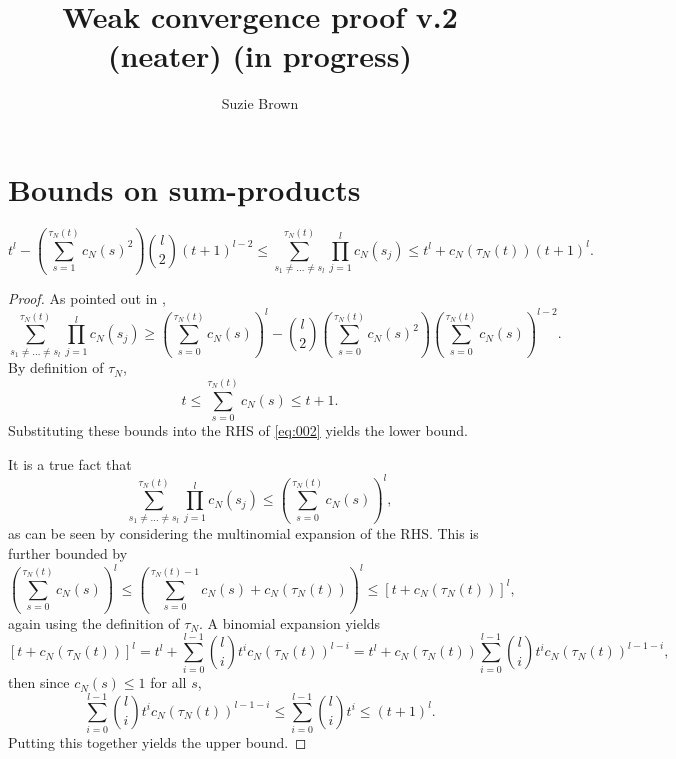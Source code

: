 \documentclass{article}
\title{Weak convergence proof v.2 (neater) (in progress)}
\author{Suzie Brown}
\newcommand{\1}[1]{\mathbbm{1}_{#1}}
\begin{document}
\maketitle
\thispagestyle{fancy}

\section*{Bounds on sum-products}

\begin{lemma}\label{thm:cleanup1}
\begin{equation}
t^l - \left( \sum_{s=1}^{\tau_N(t)} c_N(s)^2 \right) \binom{l}{2} (t+1)^{l-2} 
\leq \sum_{s_1\neq\dots\neq s_l}^{\tau_N(t)} \prod_{j=1}^l c_N(s_j)
\leq t^l + c_N(\tau_N(t)) (t+1)^l .
\end{equation}
\end{lemma}

\begin{proof}
As pointed out in \citet[Equation (8)]{koskela2018}, 
\begin{equation}\label{eq:002}
\sum_{s_1\neq\dots\neq s_l}^{\tau_N(t)} \prod_{j=1}^l c_N(s_j)
\geq \left( \sum_{s=0}^{\tau_N(t)} c_N(s) \right)^l
        - \binom{l}{2} \left( \sum_{s=0}^{\tau_N(t)} c_N(s)^2 \right)
        \left( \sum_{s=0}^{\tau_N(t)} c_N(s) \right)^{l-2} .
\end{equation}
By definition of $\tau_N$, 
\begin{equation}\label{eq:003}
t 
\leq \sum_{s=0}^{\tau_N(t)} c_N(s) 
\leq t+1 .
\end{equation}
Substituting these bounds into the RHS of \eqref{eq:002} yields the lower bound.

It is a true fact that
\begin{equation}\label{eq:005}
\sum_{s_1\neq\dots\neq s_l}^{\tau_N(t)} \prod_{j=1}^l c_N(s_j)
\leq \left( \sum_{s=0}^{\tau_N(t)} c_N(s) \right)^l ,
\end{equation}
as can be seen by considering the multinomial expansion of the RHS.
This is further bounded by
\begin{equation}
\left( \sum_{s=0}^{\tau_N(t)} c_N(s) \right)^l
\leq \left( \sum_{s=0}^{\tau_N(t) -1} c_N(s) + c_N(\tau_N(t)) \right)^l
\leq \left[ t + c_N(\tau_N(t)) \right]^l ,
\end{equation}
again using the definition of $\tau_N$.
A binomial expansion yields
\begin{equation}
\left[ t + c_N(\tau_N(t)) \right]^l
= t^l + \sum_{i=0}^{l-1} \binom{l}{i} t^i c_N(\tau_N(t))^{l-i}
= t^l + c_N(\tau_N(t)) \sum_{i=0}^{l-1} \binom{l}{i} t^i c_N(\tau_N(t))^{l-1-i} ,
\end{equation}
then since $c_N(s) \leq 1$ for all $s$,
\begin{equation}
\sum_{i=0}^{l-1} \binom{l}{i} t^i c_N(\tau_N(t))^{l-1-i}
\leq \sum_{i=0}^{l-1} \binom{l}{i} t^i
\leq (t+1)^l .
\end{equation}
Putting this together yields the upper bound.
\end{proof}
\end{document}
